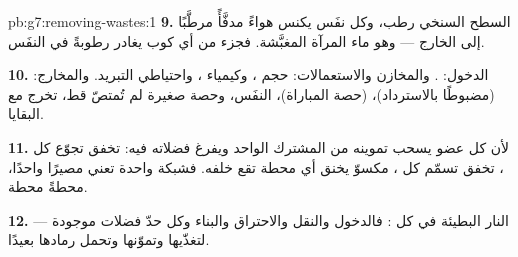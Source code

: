 \begin{solution}{pb:g7:removing-wastes:1}
\textbf{9.} السطح السنخي رطب، وكل نفَس يكنس هواءً مدفَّأً مرطَّبًا
إلى الخارج --- وهو ماء المرآة المغبَّشة. فجزء من أي كوب يغادر
رطوبةً في النفَس.

\textbf{10.} الدخول: . والمخازن والاستعمالات: حجم ،
وكيمياء ، واحتياطي التبريد. والمخارج:  (مضبوطًا
بالاسترداد)،  (حصة المباراة)،  النفَس، وحصة صغيرة لم
تُمتصّ قط، تخرج مع البقايا.

\textbf{11.} لأن كل عضو يسحب تموينه من  المشترك الواحد ويفرغ
فضلاته فيه:  تخفق تجوّع كل ،  تخفق تسمّم كل ،
 مكسوّ يخنق أي محطة تقع خلفه. فشبكة واحدة تعني مصيرًا
واحدًا، محطةً محطة.

\textbf{12.}  --- النار البطيئة في كل : فالدخول والنقل
والاحتراق والبناء وكل حدّ فضلات موجودة لتغذّيها وتموّنها وتحمل
رمادها بعيدًا.
\end{solution}
